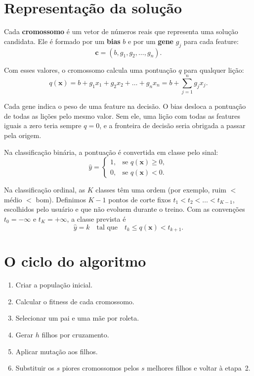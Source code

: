 \documentclass[11pt,a4paper]{article}
\newcommand{\cromo}{\mathbf{c}}
\begin{document}
\section{Representação da solução}

Cada \textbf{cromossomo} é um vetor de números reais que representa uma solução
candidata. Ele é formado por um \textbf{bias} $b$ e por um \textbf{gene} $g_j$ para
cada feature:
\begin{equation}
  \cromo = (b, g_1, g_2, \dots, g_n).
\end{equation}

Com esses valores, o cromossomo calcula uma pontuação $q$ para qualquer lição:
\begin{equation}
  q(\mathbf{x}) = b + g_1 x_1 + g_2 x_2 + \dots + g_n x_n
                = b + \sum_{j=1}^{n} g_j x_j.
  \label{eq:pontuacao}
\end{equation}

Cada gene indica o peso de uma feature na decisão. O bias desloca a pontuação de todas
as lições pelo mesmo valor. Sem ele, uma lição com todas as features iguais a zero
teria sempre $q = 0$, e a fronteira de decisão seria obrigada a passar pela origem.

Na classificação binária, a pontuação é convertida em classe pelo sinal:
\begin{equation}
  \hat{y} =
  \begin{cases}
    1, & \text{se } q(\mathbf{x}) \geq 0,\\
    0, & \text{se } q(\mathbf{x}) < 0.
  \end{cases}
  \label{eq:binario}
\end{equation}

Na classificação ordinal, as $K$ classes têm uma ordem (por exemplo,
ruim $<$ médio $<$ bom). Definimos $K-1$ pontos de corte fixos
$t_1 < t_2 < \dots < t_{K-1}$, escolhidos pelo usuário e que não evoluem durante o
treino. Com as convenções $t_0 = -\infty$ e $t_K = +\infty$, a classe prevista é
\begin{equation}
  \hat{y} = k \quad \text{tal que} \quad t_k \leq q(\mathbf{x}) < t_{k+1}.
  \label{eq:ordinal}
\end{equation}

\section{O ciclo do algoritmo}

\begin{enumerate}[nosep]
  \item Criar a população inicial.
  \item Calcular o fitness de cada cromossomo.
  \item Selecionar um pai e uma mãe por roleta.
  \item Gerar $h$ filhos por cruzamento.
  \item Aplicar mutação aos filhos.
  \item Substituir os $s$ piores cromossomos pelos $s$ melhores filhos e voltar à etapa~2.
\end{enumerate}
\end{document}
